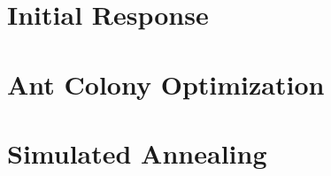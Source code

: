 \label{sec:os_implementation}




\section{Initial Response}
\label{sec:initial_response}


\section{Ant Colony Optimization}
\label{sec:aco_implementation}


\section{Simulated Annealing}
\label{sec:sa_implementation}

